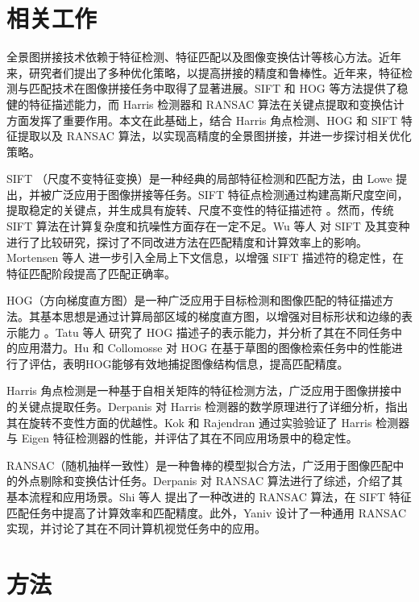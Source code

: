 \documentclass[a4paper, utf8]{ctexart}
\begin{document}
	\section{相关工作}
	
	全景图拼接技术依赖于特征检测、特征匹配以及图像变换估计等核心方法。近年来，研究者们提出了多种优化策略，以提高拼接的精度和鲁棒性。近年来，特征检测与匹配技术在图像拼接任务中取得了显著进展。SIFT 和 HOG 等方法提供了稳健的特征描述能力，而 Harris 检测器和 RANSAC 算法在关键点提取和变换估计方面发挥了重要作用。本文在此基础上，结合 Harris 角点检测、HOG 和 SIFT 特征提取以及 RANSAC 算法，以实现高精度的全景图拼接，并进一步探讨相关优化策略。
	
	SIFT （尺度不变特征变换）是一种经典的局部特征检测和匹配方法，由 Lowe 提出，并被广泛应用于图像拼接等任务。SIFT 特征点检测通过构建高斯尺度空间，提取稳定的关键点，并生成具有旋转、尺度不变性的特征描述符 \cite{wu_sift} 。然而，传统 SIFT 算法在计算复杂度和抗噪性方面存在一定不足。Wu 等人 \cite{wu_sift} 对 SIFT 及其变种进行了比较研究，探讨了不同改进方法在匹配精度和计算效率上的影响。Mortensen 等人 \cite{mortensen_sift} 进一步引入全局上下文信息，以增强 SIFT 描述符的稳定性，在特征匹配阶段提高了匹配正确率。
	
	HOG（方向梯度直方图）是一种广泛应用于目标检测和图像匹配的特征描述方法。其基本思想是通过计算局部区域的梯度直方图，以增强对目标形状和边缘的表示能力 \cite{tatu_hog}。Tatu 等人 \cite{tatu_hog} 研究了 HOG 描述子的表示能力，并分析了其在不同任务中的应用潜力。Hu 和 Collomosse \cite{hu_hog} 对 HOG 在基于草图的图像检索任务中的性能进行了评估，表明HOG能够有效地捕捉图像结构信息，提高匹配精度。
	
	Harris 角点检测是一种基于自相关矩阵的特征检测方法，广泛应用于图像拼接中的关键点提取任务。Derpanis \cite{derpanis_harris} 对 Harris 检测器的数学原理进行了详细分析，指出其在旋转不变性方面的优越性。Kok 和 Rajendran \cite{kok_harris} 通过实验验证了 Harris 检测器与 Eigen 特征检测器的性能，并评估了其在不同应用场景中的稳定性。
	
	RANSAC（随机抽样一致性）是一种鲁棒的模型拟合方法，广泛用于图像匹配中的外点剔除和变换估计任务。Derpanis \cite{derpanis_ransac} 对 RANSAC 算法进行了综述，介绍了其基本流程和应用场景。Shi 等人 \cite{siftransac} 提出了一种改进的 RANSAC 算法，在 SIFT 特征匹配任务中提高了计算效率和匹配精度。此外，Yaniv \cite{yaniv_ransac} 设计了一种通用 RANSAC 实现，并讨论了其在不同计算机视觉任务中的应用。
	
	\section{方法}
	
\end{document}
